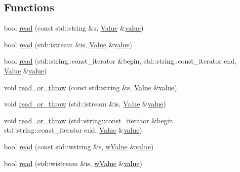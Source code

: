 \subsection*{Functions}
\begin{DoxyCompactItemize}
\item 
bool \hyperlink{namespacejson__spirit_a7eba64a00505782ab25bba4f2ebe452a}{read} (const std\+::string \&s, \hyperlink{namespacejson__spirit_a28e6abc99fda7b06c430ca38802527a3}{Value} \&\hyperlink{cache_8cc_a0f61d63b009d0880a89c843bd50d8d76}{value})
\item 
bool \hyperlink{namespacejson__spirit_a0ed9d1adfd2e5a7a0d6513c84c28a319}{read} (std\+::istream \&is, \hyperlink{namespacejson__spirit_a28e6abc99fda7b06c430ca38802527a3}{Value} \&\hyperlink{cache_8cc_a0f61d63b009d0880a89c843bd50d8d76}{value})
\item 
bool \hyperlink{namespacejson__spirit_a5e2c0bb72aebce09905ac59f8622213e}{read} (std\+::string\+::const\+\_\+iterator \&begin, std\+::string\+::const\+\_\+iterator end, \hyperlink{namespacejson__spirit_a28e6abc99fda7b06c430ca38802527a3}{Value} \&\hyperlink{cache_8cc_a0f61d63b009d0880a89c843bd50d8d76}{value})
\item 
void \hyperlink{namespacejson__spirit_aa16a84425d592a4be2400dacfc4f29b2}{read\+\_\+or\+\_\+throw} (const std\+::string \&s, \hyperlink{namespacejson__spirit_a28e6abc99fda7b06c430ca38802527a3}{Value} \&\hyperlink{cache_8cc_a0f61d63b009d0880a89c843bd50d8d76}{value})
\item 
void \hyperlink{namespacejson__spirit_ab9fc7fcf57980ae8cc83d6ceb22813ca}{read\+\_\+or\+\_\+throw} (std\+::istream \&is, \hyperlink{namespacejson__spirit_a28e6abc99fda7b06c430ca38802527a3}{Value} \&\hyperlink{cache_8cc_a0f61d63b009d0880a89c843bd50d8d76}{value})
\item 
void \hyperlink{namespacejson__spirit_a3ca4eb69c9f7eeab6ac872059cbcd9c2}{read\+\_\+or\+\_\+throw} (std\+::string\+::const\+\_\+iterator \&begin, std\+::string\+::const\+\_\+iterator end, \hyperlink{namespacejson__spirit_a28e6abc99fda7b06c430ca38802527a3}{Value} \&\hyperlink{cache_8cc_a0f61d63b009d0880a89c843bd50d8d76}{value})
\item 
bool \hyperlink{namespacejson__spirit_a538a172b430526e4eb01135f83a1c1a1}{read} (const std\+::wstring \&s, \hyperlink{namespacejson__spirit_a048cde4e921b6f41cbc0fab1cbc352e8}{w\+Value} \&\hyperlink{cache_8cc_a0f61d63b009d0880a89c843bd50d8d76}{value})
\item 
bool \hyperlink{namespacejson__spirit_aeafe75d70df613cb617a8a9b084fcb0f}{read} (std\+::wistream \&is, \hyperlink{namespacejson__spirit_a048cde4e921b6f41cbc0fab1cbc352e8}{w\+Value} \&\hyperlink{cache_8cc_a0f61d63b009d0880a89c843bd50d8d76}{value})

\end{DoxyCompactItemize}
